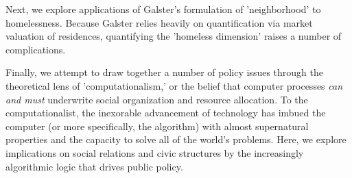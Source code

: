 Next, we explore applications of Galster's formulation of
'neighborhood' to homelessness. Because Galster relies heavily on
quantification via market valuation of residences, quantifying the
'homeless dimension' raises a number of complications.

Finally, we attempt to draw together a number of policy issues through
the theoretical lens of 'computationalism,' or the belief that
computer processes \emph{can and must} underwrite social organization
and resource allocation.  To the computationalist, the inexorable
advancement of technology has imbued the computer (or more
specifically, the algorithm) with almost supernatural properties and
the capacity to solve all of the world's problems. Here, we explore
implications on social relations and civic structures by the
increasingly algorithmic logic that drives public policy.
